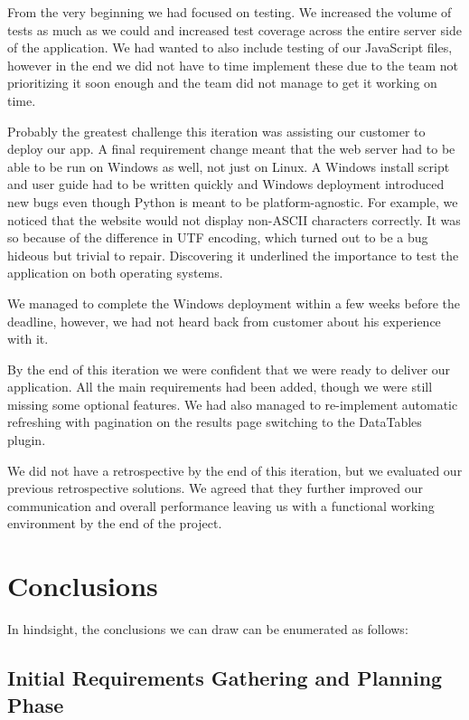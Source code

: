 \documentclass{l3proj}
\begin{document}
From the very beginning we had focused on testing.  We increased the volume of tests as much as we could and increased test coverage across the entire server side of the application. We had wanted to also include testing of our JavaScript files, however in the end we did not have to time implement these due to the team not prioritizing it soon enough and the team did not manage to get it working on time.


Probably the greatest challenge this iteration was assisting our customer to deploy our app. A final requirement change meant that the web server had to be able to be run on Windows as well, not just on Linux. A Windows install script and user guide had to be written quickly and Windows deployment introduced new bugs even though Python is meant to be platform-agnostic. For example, we noticed that the website would not display non-ASCII characters correctly. It was so because of the difference in UTF encoding, which turned out to be a bug hideous but trivial to repair. Discovering it underlined the importance to test the application on both operating systems.

We managed to complete the Windows deployment within a few weeks before the deadline, however, we had not heard back from customer about his experience with it. 

By the end of this iteration we were confident that we were ready to deliver our application. All the main requirements had been added, though we were still missing some optional features. We had also managed to re-implement automatic refreshing with pagination on the results page switching to the DataTables plugin.

We did not have a retrospective by the end of this iteration, but we evaluated our previous retrospective solutions. We agreed that they further improved our communication and overall performance leaving us with a functional working environment by the end of the project.

\section{Conclusions}

In hindsight, the conclusions we can draw can be enumerated as follows:

\subsection{Initial Requirements Gathering and Planning Phase}
\end{document}
